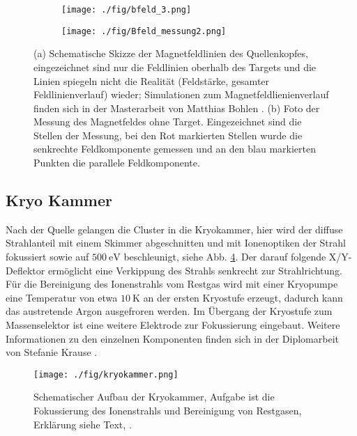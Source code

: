 \begin{figure}
    \begin{subfigure}[t]{0.415\textwidth}
      \texttt{[image: ./fig/bfeld\_3.png]}
      \caption{}
      \label{fig:bfeld_3}
    \end{subfigure}\hfill
    \begin{subfigure}[t]{0.435\textwidth}
      \texttt{[image: ./fig/Bfeld\_messung2.png]}
      \caption{}
      \label{fig:bfeld_3}
    \end{subfigure}
    \caption{(a) Schematische Skizze der Magnetfeldlinien des Quellenkopfes, eingezeichnet sind nur die Feldlinien oberhalb des Targets und die Linien spiegeln nicht die Realität (Feldstärke, gesamter Feldlinienverlauf) wieder; Simulationen zum Magnetfeldlienienverlauf finden sich in der Masterarbeit von Matthias Bohlen \cite{bohlen}. (b) Foto der Messung des Magnetfeldes  ohne Target. Eingezeichnet sind die Stellen der Messung, bei den Rot markierten Stellen wurde die senkrechte Feldkomponente gemessen und an den blau markierten Punkten die parallele Feldkomponente.}
    \label{fig:schleuse_innen}
\end{figure}
\clearpage 
\subsection{Kryo Kammer}
Nach der Quelle gelangen die Cluster in die Kryokammer, hier wird der diffuse Strahlanteil mit einem Skimmer abgeschnitten und mit Ionenoptiken der Strahl fokussiert sowie auf $\SI{500}{\eV}$ beschleunigt, siehe Abb. \ref{fig:kryokammer}.
Der darauf folgende X/Y-Deflektor ermöglicht eine Verkippung des Strahls senkrecht zur Strahlrichtung.
Für die Bereinigung des Ionenstrahls vom Restgas wird mit einer Kryopumpe eine Temperatur von etwa $\SI{10}{\kelvin}$ \cite[S. 27]{woltermaster} an der ersten Kryostufe erzeugt, dadurch kann das austretende Argon ausgefroren werden.
Im Übergang der Kryostufe zum Massenselektor ist eine weitere Elektrode zur Fokussierung eingebaut.
Weitere Informationen zu den einzelnen Komponenten finden sich in der Diplomarbeit von Stefanie Krause \cite{krause}.
\begin{figure}
    \centering
    \texttt{[image: ./fig/kryokammer.png]}
    \caption{Schematischer Aufbau der Kryokammer, Aufgabe ist die Fokussierung des Ionenstrahls und Bereinigung von Restgasen, Erklärung siehe Text, \cite{woltermaster}.}
    \label{fig:kryokammer}
\end{figure}
